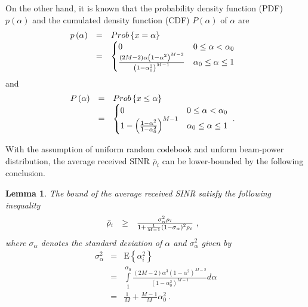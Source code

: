 \documentclass[10pt,fleqn, twocolumn]{IEEEtran}
\newtheorem{lemma}{Lemma}
\begin{document}
On the other hand, it is known that the probability density
function (PDF) $p\left(\alpha\right)$ and the cumulated density
function (CDF) $P\left(\alpha\right)$ of $\alpha$ are
\begin{equation}\hspace{-0.10in}
\begin{array}{rcl}
p\left(\alpha\right)&=&\mbox{Prob}\left\{x=\alpha\right\}\\
&=&\begin{cases}
0 & 0\leq \alpha < \alpha_{0} \\
\frac{\left(2M-2\right)\alpha\left(1-\alpha^2\right)^{M-2}}{\left(1-\alpha_{0}^{2}\right)^{M-1}}
& \alpha_{0}\leq\alpha\leq 1
\end{cases}
\end{array}
\end{equation}
\noindent and
\begin{equation}\hspace{-0.10in}
\begin{array}{rcl}
P\left(\alpha\right)&=&\mbox{Prob}\left\{x\leq\alpha\right\} \\
&=&
\begin{cases}
0 & 0 \leq\alpha < \alpha_{0} \\
1-\left(\frac{1-\alpha^2}{1-\alpha_{0}^2}\right)^{M-1} &
\alpha_{0}\leq\alpha\leq 1
\end{cases}\ .
\end{array}
\end{equation}

With the assumption of uniform random codebook and unform
beam-power distribution, the average received SINR $\bar\rho_{i}$
can be lower-bounded by the following conclusion.
\begin{lemma} The bound of the average received SINR satisfy the
following inequality
\begin{equation}\hspace{-0.10in}
\begin{array}{rcl}
\bar\rho_{i}&\geq& \frac{\sigma_{\alpha}^{2}\rho_{i}}{1+
\frac{1}{M-1}\left(1-\sigma_{\alpha}\right)^{2}\rho_{i}}\ ,
\end{array}
\end{equation}
\noindent where  $\sigma_{\alpha}$ denotes the standard deviation
of $\alpha$ and $\sigma_{\alpha}^2$ given by
\begin{equation}
\begin{array}{rcl}
\sigma_{\alpha}^2&=&\mbox{E}\left\{\alpha_{i}^2\right\}\\
&=&\int\limits_{1}^{\alpha_{0}}\frac{\left(2M-2\right)\alpha^3\left(1-\alpha^2\right)^{M-2}}{\left(1-\alpha_{0}^{2}\right)^{M-1}}d\alpha\\
&=&\frac{1}{M}+\frac{M-1}{M}\alpha_{0}^2\ .
\end{array}
\end{equation}
\end{lemma}
\end{document}
